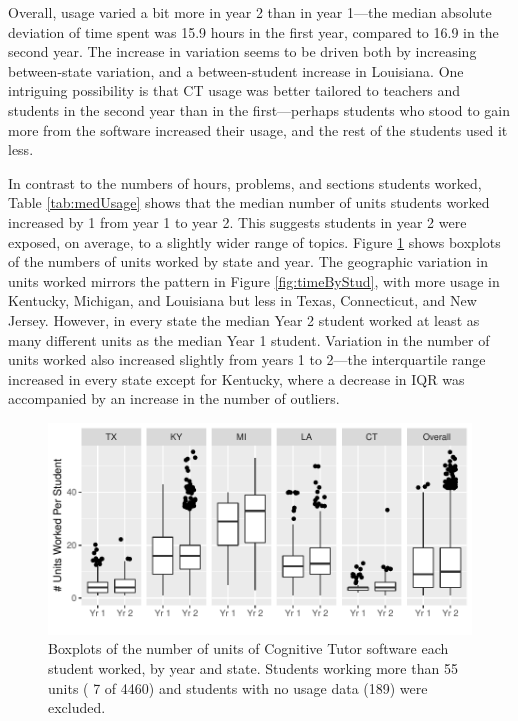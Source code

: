 \documentclass[12pt]{article}\usepackage[]{graphicx}\usepackage[]{color}
\makeatletter
\def\maxwidth{ %
  \ifdim\Gin@nat@width>\linewidth
    \linewidth
  \else
    \Gin@nat@width
  \fi
}
\makeatother
\begin{document}
Overall, usage varied a bit more in year 2 than in year
1---the median absolute deviation of time spent was 15.9 hours in the first year, compared to 16.9 in  the second year.
The increase in variation seems to be driven both by increasing
between-state variation, and a between-student increase in Louisiana.
One intriguing possibility is that CT usage was better tailored to
teachers and students in the second year than in the first---perhaps
students who stood to gain more from the software increased their
usage, and the rest of the students used it less.

In contrast to the numbers of hours, problems, and sections students
worked, Table \ref{tab:medUsage} shows that the median number of units
students worked increased by
1
from year 1 to year 2.
This suggests students in year 2 were exposed, on average, to a
slightly wider range of topics.
Figure \ref{fig:unitsByStud} shows boxplots of the numbers of units
worked by state and year.
The geographic variation in units worked mirrors the pattern in Figure
\ref{fig:timeByStud}, with more usage in Kentucky, Michigan, and
Louisiana but less in Texas, Connecticut, and New Jersey.
However, in every state the median Year 2 student worked at least as
many different units as the median Year 1 student.
Variation in the number of units worked also increased slightly
from years 1 to 2---the interquartile range increased in every state
except for Kentucky, where a decrease in IQR was accompanied by an
increase in the number of outliers.



\begin{figure}
\centering

\includegraphics[width=\maxwidth]{figure/unitsWorked-1} 

\caption{Boxplots of the number of units of Cognitive Tutor
  software each student worked, by year and state. Students
  working more than 55 units (
  7 of
  4460) and students
  with no usage data (189)
  were excluded.}
\label{fig:unitsByStud}
\end{figure}
\end{document}

